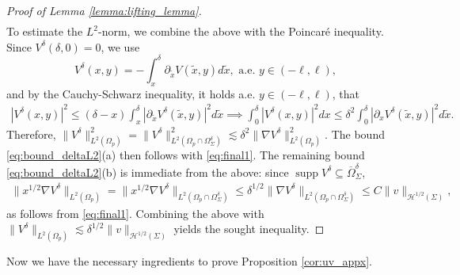 \documentclass[report]{elsarticle}
\numberwithin{theorem}{section}
\begin{document}
\begin{proof}[Proof of Lemma \ref{lemma:lifting_lemma}]
\begin{align}
	\end{align}
	To estimate the $L^2$-norm, we combine the above  with the Poincar\'e inequality. Since $V^{\delta}(\delta,0)=0$, we use $$V^{\delta}(x,y)=-\int_{x}^{\delta}\partial_{\tilde{x}}V(\tilde{x},y)d\tilde{x},\text{ a.e. }y\in (-\ell,\ell),$$
	and by the Cauchy-Schwarz inequality, it holds a.e. $y\in (-\ell,\ell)$, that
	\begin{align*}
		|V^{\delta}(x,y)|^2\leq (\delta-x)\int_{x}^\delta|\partial_{\tilde{x}} V^{\delta}(\tilde{x},y)|^2 d\tilde{x} \implies \int_0^{\delta}|V^{\delta}(x,y)|^2dx\leq \delta^2 \int_0^{\delta}|\partial_x V^{\delta}(\tilde{x},y)|^2 d\tilde{x}.
	\end{align*}
	Therefore,  $
		\|V^{\delta}\|^2_{L^2(\Omega_p)}=		\|V^{\delta}\|^2_{L^2(\Omega_p\cap\Omega_{\Sigma}^{\delta})}\lesssim \delta^2\|\nabla V^{\delta}\|^2_{L^2(\Omega_p)}. $
		The bound \eqref{eq:bound_deltaL2}(a)  then follows with \eqref{eq:final1}. The remaining bound \eqref{eq:bound_deltaL2}(b) is immediate from the above: since $\operatorname{supp}V^{\delta}\subseteq \overline{\Omega}_{\Sigma}^{\delta}$, 
	\begin{align*}
		\|x^{1/2}\nabla V^{\delta}\|_{L^2(\Omega_p)}=	\|x^{1/2}\nabla V^{\delta}\|_{L^2(\Omega_p\cap \Omega_{\Sigma}^{\delta})}\leq   \delta^{1/2}\|\nabla V^{\delta}\|_{L^2(\Omega_p\cap \Omega_{\Sigma}^{\delta})}\leq C \|v\|_{\mathcal{H}^{1/2}(\Sigma)},
	\end{align*}
	as follows from \eqref{eq:final1}. Combining the above with $\|V^{\delta}\|_{L^2(\Omega_p)}\lesssim \delta^{1/2}\|v\|_{\mathcal{H}^{1/2}(\Sigma)}$ yields the sought inequality.
\end{proof}
Now we have the necessary ingredients to prove Proposition \ref{cor:uv_appx}. 
\end{document}
